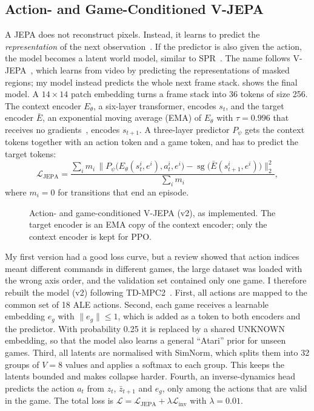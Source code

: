 \documentclass[runningheads]{llncs}
\begin{document}
\FloatBarrier
\subsection{Action- and Game-Conditioned V-JEPA}

A JEPA does not reconstruct pixels. Instead, it learns to predict the \emph{representation}
of the next observation~\cite{lecun2022path}. If the predictor is also given the action, the
model becomes a latent world model, similar to SPR~\cite{schwarzer2021spr}. The name follows
V-JEPA~\cite{bardes2024vjepa}, which learns from video by predicting the representations of
masked regions; my model instead predicts the whole next frame stack. 
shows the final model. A $14\times14$ patch embedding turns a frame stack into 36 tokens of
size 256. The context encoder $E_\theta$, a six-layer transformer, encodes $s_t$, and the
target encoder $\bar E$, an exponential moving average (EMA) of $E_\theta$ with $\tau=0.996$
that receives no gradients~\cite{assran2023ijepa}, encodes $s_{t+1}$. A three-layer predictor
$P_\psi$ gets the context tokens together with an action token and a game token, and has to
predict the target tokens:
\begin{equation}
  \mathcal{L}_{\text{JEPA}}=\frac{\sum_i m_i\,\big\|P_\psi\big(E_\theta(s_t^i,e^i),a_t^i,e^i\big)
  -\operatorname{sg}\big(\bar E(s_{t+1}^i,e^i)\big)\big\|_2^2}{\sum_i m_i},
\end{equation}
where $m_i=0$ for transitions that end an episode.

\begin{figure}[!htbp]
\centering

\caption{Action- and game-conditioned V-JEPA (v2), as implemented. The target
encoder is an EMA copy of the context encoder; only the context encoder is kept for PPO.}
\label{fig:jepa}
\end{figure}

My first version had a good loss curve, but a review showed that action indices meant
different commands in different games, the large dataset was loaded with the wrong axis order,
and the validation set contained only one game.
I therefore rebuilt the model (v2) following TD-MPC2~\cite{hansen2024tdmpc2}. First, all actions are mapped to the common set of 18 ALE actions. Second, each game
receives a learnable embedding $e_g$ with $\|e_g\|\le1$, which is added as a token to both
encoders and the predictor. With probability 0.25 it is replaced by a shared UNKNOWN
embedding, so that the model also learns a general ``Atari'' prior for unseen games. Third, all
latents are normalised with SimNorm, which splits them into 32 groups of $V=8$ values and
applies a softmax to each group. This keeps the latents bounded and makes collapse harder. Fourth,
an inverse-dynamics head~\cite{pathak2017icm} predicts the action $a_t$ from $z_t$,
$\bar z_{t+1}$ and $e_g$, only among the actions that are valid in the game. The total loss is
$\mathcal{L}=\mathcal{L}_{\text{JEPA}}+\lambda\mathcal{L}_{\text{inv}}$ with $\lambda=0.01$.
\end{document}
